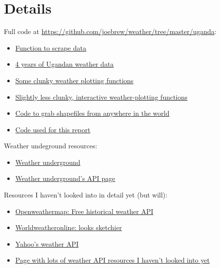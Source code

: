 \documentclass[11pt]{article}
\begin{document}
\newpage
\section*{Details}
\hrulefill

Full code at \href{https://github.com/joebrew/weather/tree/master/uganda}{https://github.com/joebrew/weather/tree/master/uganda}: 
\begin{itemize}
\item \href{https://github.com/joebrew/weather/blob/master/uganda/scrape_data.R}{Function to scrape data}
\item \href{https://github.com/joebrew/weather/blob/master/uganda/uganda_weather.csv}{4 years of Ugandan weather data}
\item \href{https://github.com/joebrew/weather/blob/master/uganda/visualization_functions.R}{Some clunky weather plotting functions}
\item \href{https://github.com/joebrew/weather/blob/master/uganda/visualization_interactive.R}{Slightly less clunky, interactive weather-plotting functions}
\item \href{https://github.com/joebrew/weather/blob/master/uganda/gadm.R}{Code to grab shapefiles from anywhere in the world}
\item \href{https://github.com/joebrew/weather/tree/master/uganda_weather_first_pass}{Code used for this report} \\
\end{itemize}

Weather undeground resources: \begin{itemize}
\item \href{www.wunderground.com}{Weather underground} 
\item \href{http://www.wunderground.com/weather/api/}{Weather underground's API page} \\
\end{itemize}

Resources I haven't looked into in detail yet (but will): \begin{itemize}
\item \href{http://openweathermap.org/history}{Openweathermap: Free historical weather API}
\item \href{http://www.worldweatheronline.com/api/local-city-town-weather-api.aspx}{Worldweatheronline: looks sketchier}
\item \href{https://developer.yahoo.com/weather/#get-started}{Yahoo's weather API}
\item \href{http://www.programmableweb.com/news/26-weather-apis-12-support-json/2012/01/11}{Page with lots of weather API resources I haven't looked into yet} \\
\end{itemize}
\end{document}
